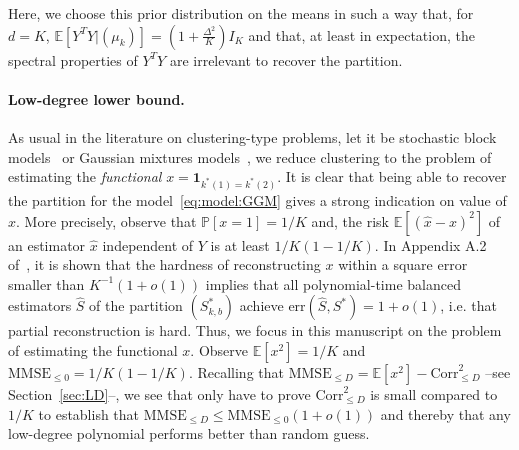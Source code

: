 \documentclass{article}
\begin{document}
\medskip 


Here, we choose this prior distribution on the means in such a way that, for $d=K$,  $\mathbb{E}[Y^TY|(\mu_k)]= (1+ \frac{\Delta^2}{K})I_K$ and that, at least in expectation, the spectral properties of $Y^TY$ are irrelevant to recover the partition. 






\paragraph{Low-degree lower bound.}
As usual in the literature on clustering-type problems, let it be stochastic block models~\cite{SohnWein25} or Gaussian mixtures models~\cite{Even24}, we reduce clustering to the problem of estimating the \emph{functional} $x= \mathbf{1}_{k^*(1)=k^*(2)}$. It is clear that being able to recover the partition for the model~\eqref{eq:model:GGM} gives a strong indication on value of $x$. More precisely, observe that $\mathbb{P}[x=1]=1/K$ and, the risk $\mathbb{E}[(\hat{x}-x)^2]$ of an estimator $\hat{x}$ independent of $Y$ is at least $1/K(1-1/K)$. In Appendix A.2 of~\cite{Even25}, it is shown that the hardness of reconstructing $x$ within a square error smaller than $K^{-1}(1+o(1))$ implies that all polynomial-time balanced estimators $\hat{S}$ of the partition $(S_{k,b}^*)$ achieve $\mathrm{err}(\hat{S},S^*)= 1+o(1)$, i.e. that partial reconstruction is hard.  Thus, we focus in this manuscript on the problem of estimating the functional $x$.  Observe $\mathbb{E}[x^2]=1/K$ and $\mathrm{MMSE}_{\leq 0}=1/K(1-1/K)$. Recalling that $\mathrm{MMSE}_{\leq D}= \mathbb{E}[x^2]- \mathrm{Corr}^2_{\leq D}$ --see Section~\ref{sec:LD}--, we see that only have to prove $\mathrm{Corr}^2_{\leq D}$ is small compared to $1/K$ to establish that $\mathrm{MMSE}_{\leq D}\leq \mathrm{MMSE}_{\leq 0}(1+o(1))$ and thereby that any low-degree polynomial performs better than random guess. 
\end{document}
